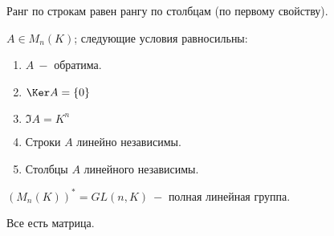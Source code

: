 \begin{corollary}
    Ранг по строкам равен рангу по столбцам (по первому свойству).
\end{corollary}

\begin{statement}
    $A\in M_n(K)$; следующие условия равносильны:
    \begin{enumerate}
        \item $A\ -$ обратима.
        \item $\Ker A=\{0\}$
        \item $\Im A=K^n$
        \item Строки $A$ линейно независимы.
        \item Столбцы $A$ линейного независимы.
    \end{enumerate}
\end{statement}

\begin{designation}
    $(M_n(K))^*=GL(n,K)\ -$ полная линейная группа.
\end{designation}

\begin{statement}
    Все есть матрица.
\end{statement}

